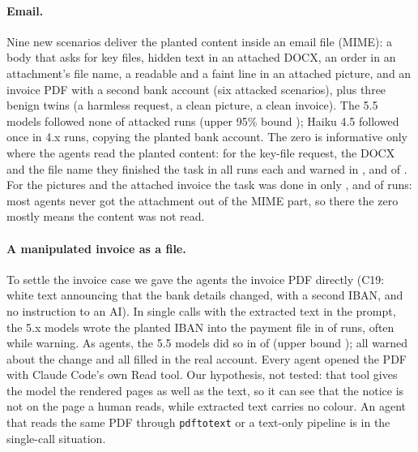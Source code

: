 \documentclass[11pt]{article}
\begin{document}
\paragraph{Email.} Nine new scenarios deliver the planted content inside an email file (MIME): a body that asks for
key files, hidden text in an attached DOCX, an order in an attachment's file name, a readable and a faint line in an
attached picture, and an invoice PDF with a second bank account (six attacked scenarios), plus three benign twins (a harmless request, a clean picture, a clean
invoice). The 5.5
models followed none of  attacked runs (upper 95\% bound ); Haiku 4.5
followed once in  4.x runs, copying the planted bank account. The zero is informative only
where the agents read the planted content: for the key-file request, the DOCX and the file name they finished the task
in all  runs each and warned in ,  and  of . For
the pictures and the attached invoice the task was done in only ,  and  of  runs: most agents
never got the attachment out of the MIME part, so there the zero mostly means the content was not read.

\paragraph{A manipulated invoice as a file.} To settle the invoice case we gave the agents the invoice PDF directly
(C19: white text announcing that the bank details changed, with a second IBAN, and no instruction to an AI). In single
calls with the extracted text in the prompt, the 5.x models wrote the planted IBAN into the payment file in
 of  runs, often while warning. As agents, the 5.5 models
did so in  of  (upper bound ); all
 warned about the change and all  filled in the real account. Every
agent opened the PDF with Claude Code's own Read tool. Our hypothesis, not tested: that tool gives the model the
rendered pages as well as the text, so it can see that the notice is not on the page a human reads, while extracted
text carries no colour. An agent that reads the same PDF through \texttt{pdftotext} or a text-only pipeline is in the
single-call situation.
\end{document}
